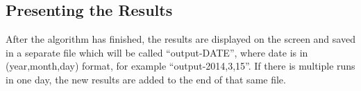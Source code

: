     \subsection{Presenting the Results} %
    \label{sub:presenting_the_results}
    After the algorithm has finished, the results are displayed on the screen and saved in a separate file which will be called ``output-DATE'', where date is in (year,month,day) format, for example ``output-2014,3,15''. If there is multiple runs in one day, the new results are added to the end of that same file.


  

  

  

  

  
